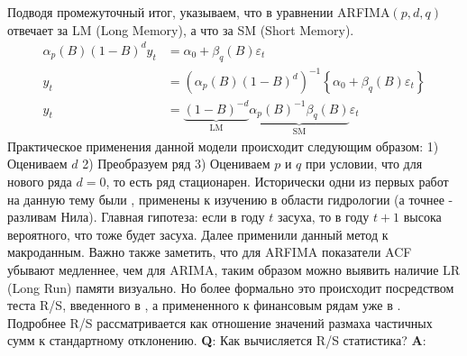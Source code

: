 Подводя промежуточный итог, указываем, что в уравнении ARFIMA$(p, d, q)$ отвечает за LM (Long Memory), а что за SM (Short Memory).
\begin{equation}
	\begin{split}
		\alpha_p(B) (1 - B)^d y_t & = \alpha_0 + \beta_{q}(B) \varepsilon_{t}\\
		y_t & = \left(\alpha_p(B) (1 - B)^d\right)^{-1} \left\{\alpha_0 + \beta_{q}(B) \varepsilon_{t}\right\}\\
		y_t & = \underbrace{(1 - B)^{-d}}_{\text{LM}} \underbrace{\alpha_p(B)^{-1} \beta_{q}(B)}_{\text{SM}} \varepsilon_{t}
	\end{split}
\end{equation}
Практическое применения данной модели происходит следующим образом: 1) Оцениваем $d$ 2) Преобразуем ряд 3) Оцениваем $p$ и $q$ при условии, что для нового ряда $d = 0$, то есть ряд стационарен. Исторически одни из первых работ на данную тему были \cite{hosking_1981}, \cite{hurst1951long} применены к изучению в области гидрологии (а точнее - разливам Нила). Главная гипотеза: если в году $t$ засуха, то в году $t + 1$ высока вероятного, что тоже будет засуха. Далее \cite{granger1980introduction} применили данный метод к макроданным. Важно также заметить, что для ARFIMA показатели ACF убывают медленнее, чем для ARIMA, таким образом можно выявить наличие LR (Long Run) памяти визуально. Но более формально это происходит посредством теста R/S, введенного в \cite{hurst1951long}, а примененного к финансовым рядам уже в \cite{mandelbrot1972statistical}. Подробнее R/S рассматривается как отношение значений размаха частичных сумм к стандартному отклонению. \textbf{Q}: Как вычисляется R/S статистика? \textbf{A}:
